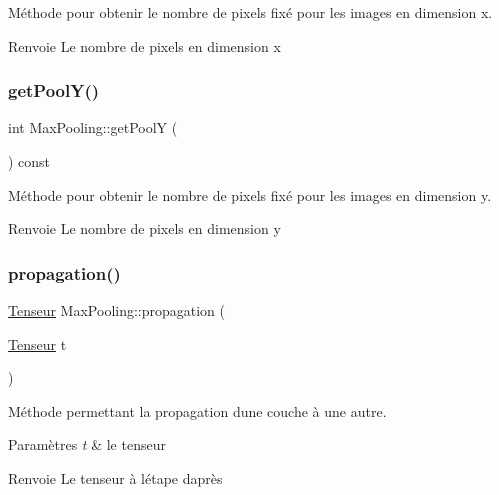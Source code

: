 Méthode pour obtenir le nombre de pixels fixé pour les images en dimension x. 

\begin{DoxyReturn}{Renvoie}
Le nombre de pixels en dimension x 
\end{DoxyReturn}
\mbox{\label{classMaxPooling_a7c72e57c8a90e18804b288f28fde7af0}} 
\subsubsection{\texorpdfstring{get\+Pool\+Y()}{getPoolY()}}
{\footnotesize\ttfamily int Max\+Pooling\+::get\+PoolY (\begin{DoxyParamCaption}{ }\end{DoxyParamCaption}) const}



Méthode pour obtenir le nombre de pixels fixé pour les images en dimension y. 

\begin{DoxyReturn}{Renvoie}
Le nombre de pixels en dimension y 
\end{DoxyReturn}
\mbox{\label{classMaxPooling_a48e0258bf1f949853cfceb2726035fb8}} 
\subsubsection{\texorpdfstring{propagation()}{propagation()}}
{\footnotesize\ttfamily \hyperlink{classTenseur}{Tenseur} Max\+Pooling\+::propagation (\begin{DoxyParamCaption}\item[{\hyperlink{classTenseur}{Tenseur}}]{t }\end{DoxyParamCaption})\hspace{0.3cm}{\ttfamily [virtual]}}



Méthode permettant la propagation d\textquotesingle{}une couche à une autre. 


\begin{DoxyParams}{Paramètres}
{\em t} & le tenseur \\
\hline
\end{DoxyParams}
\begin{DoxyReturn}{Renvoie}
Le tenseur à l\textquotesingle{}étape d\textquotesingle{}après 
\end{DoxyReturn}


